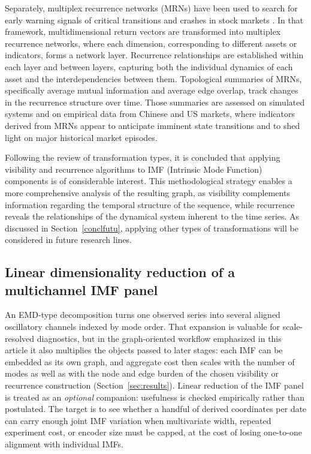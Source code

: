 \documentclass[11pt,a4paper]{article}
\begin{document}
Separately, multiplex recurrence networks (MRNs) have been used to search for early warning signals of critical transitions and crashes in stock markets \citep{song2024early}. In that framework, multidimensional return vectors are transformed into multiplex recurrence networks, where each dimension, corresponding to different assets or indicators, forms a network layer. Recurrence relationships are established within each layer and between layers, capturing both the individual dynamics of each asset and the interdependencies between them. Topological summaries of MRNs, specifically average mutual information and average edge overlap, track changes in the recurrence structure over time. Those summaries are assessed on simulated systems and on empirical data from Chinese and US markets, where indicators derived from MRNs appear to anticipate imminent state transitions and to shed light on major historical market episodes.

Following the review of transformation types, it is concluded that applying visibility and recurrence algorithms to IMF (Intrinsic Mode Function) components is of considerable interest. This methodological strategy enables a more comprehensive analysis of the resulting graph, as visibility complements information regarding the temporal structure of the sequence, while recurrence reveals the relationships of the dynamical system inherent to the time series. As discussed in Section~\ref{conclfutu}, applying other types of transformations will be considered in future research lines.

\subsection{Linear dimensionality reduction of a multichannel IMF panel}
\label{sec:method_dim_red}

An EMD-type decomposition turns one observed series into several aligned oscillatory channels indexed by mode order. That expansion is valuable for scale-resolved diagnostics, but in the graph-oriented workflow emphasized in this article it also multiplies the objects passed to later stages: each IMF can be embedded as its own graph, and aggregate cost then scales with the number of modes as well as with the node and edge burden of the chosen visibility or recurrence construction (Section~\ref{sec:results}). Linear reduction of the IMF panel is treated as an \emph{optional} companion: usefulness is checked empirically rather than postulated. The target is to see whether a handful of derived coordinates per date can carry enough joint IMF variation when multivariate width, repeated experiment cost, or encoder size must be capped, at the cost of losing one-to-one alignment with individual IMFs.
\end{document}
